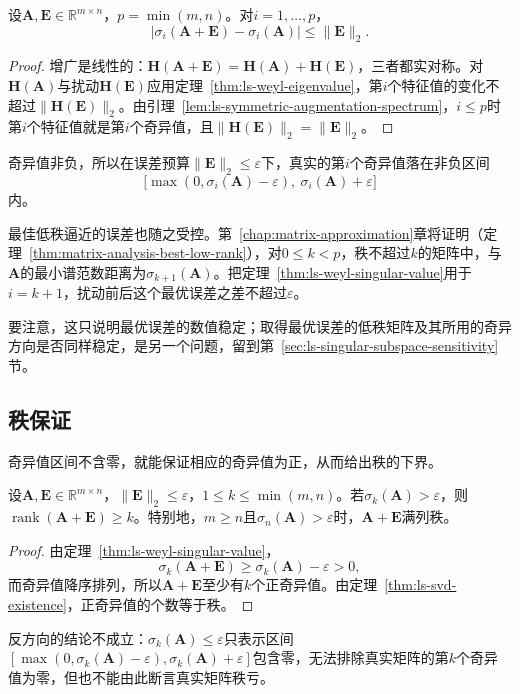 \begin{theorem}[奇异值的Weyl界]
\label{thm:ls-weyl-singular-value}
设$\bm A,\bm E\in\mathbb R^{m\times n}$，$p=\min(m,n)$。对$i=1,\ldots,p$，
\begin{equation}
 |\sigma_i(\bm A+\bm E)-\sigma_i(\bm A)|\leq\lVert\bm E\rVert_2 .
 \label{eq:matrix-analysis-singular-value-perturbation}
\end{equation}
\end{theorem}
\begin{proof}
增广是线性的：$\bm H(\bm A+\bm E)=\bm H(\bm A)+\bm H(\bm E)$，三者都实对称。对$\bm H(\bm A)$与扰动$\bm H(\bm E)$应用定理~\ref{thm:ls-weyl-eigenvalue}，第$i$个特征值的变化不超过$\lVert\bm H(\bm E)\rVert_2$。由引理~\ref{lem:ls-symmetric-augmentation-spectrum}，$i\leq p$时第$i$个特征值就是第$i$个奇异值，且$\lVert\bm H(\bm E)\rVert_2=\lVert\bm E\rVert_2$。
\end{proof}
奇异值非负，所以在误差预算$\lVert\bm E\rVert_2\leq\varepsilon$下，真实的第$i$个奇异值落在非负区间
\[
 \bigl[\max(0,\sigma_i(\bm A)-\varepsilon),\ \sigma_i(\bm A)+\varepsilon\bigr]
\]
内。

最佳低秩逼近的误差也随之受控。第~\ref{chap:matrix-approximation}章将证明（定理~\ref{thm:matrix-analysis-best-low-rank}），对$0\leq k<p$，秩不超过$k$的矩阵中，与$\bm A$的最小谱范数距离为$\sigma_{k+1}(\bm A)$。把定理~\ref{thm:ls-weyl-singular-value}用于$i=k+1$，扰动前后这个最优误差之差不超过$\varepsilon$。

要注意，这只说明最优误差的数值稳定；取得最优误差的低秩矩阵及其所用的奇异方向是否同样稳定，是另一个问题，留到第~\ref{sec:ls-singular-subspace-sensitivity}节。

\subsection{秩保证}

奇异值区间不含零，就能保证相应的奇异值为正，从而给出秩的下界。
\begin{theorem}[由奇异值保证秩]
\label{thm:ls-singular-value-rank-guarantee}
设$\bm A,\bm E\in\mathbb R^{m\times n}$，$\lVert\bm E\rVert_2\leq\varepsilon$，$1\leq k\leq\min(m,n)$。若$\sigma_k(\bm A)>\varepsilon$，则$\operatorname{rank}(\bm A+\bm E)\geq k$。特别地，$m\geq n$且$\sigma_n(\bm A)>\varepsilon$时，$\bm A+\bm E$满列秩。
\end{theorem}
\begin{proof}
由定理~\ref{thm:ls-weyl-singular-value}，
\[
 \sigma_k(\bm A+\bm E)\geq\sigma_k(\bm A)-\varepsilon>0 ,
\]
而奇异值降序排列，所以$\bm A+\bm E$至少有$k$个正奇异值。由定理~\ref{thm:ls-svd-existence}，正奇异值的个数等于秩。
\end{proof}
反方向的结论不成立：$\sigma_k(\bm A)\leq\varepsilon$只表示区间$[\max(0,\sigma_k(\bm A)-\varepsilon),\sigma_k(\bm A)+\varepsilon]$包含零，无法排除真实矩阵的第$k$个奇异值为零，但也不能由此断言真实矩阵秩亏。

